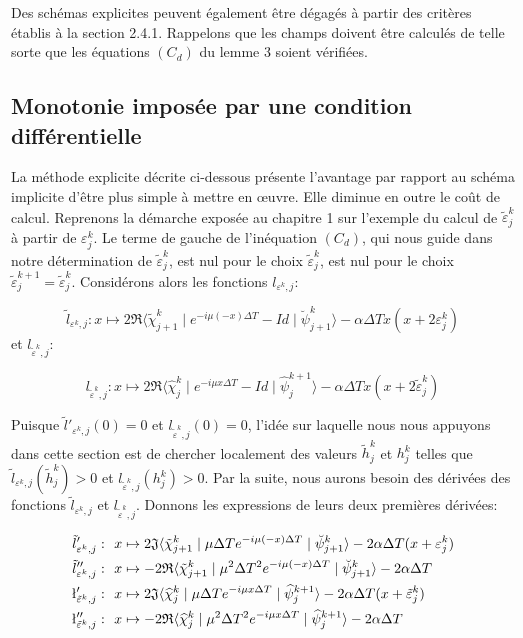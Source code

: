 Des schémas explicites peuvent également être dégagés à partir des critères établis à la section 2.4.1. Rappelons que les champs doivent être calculés de telle sorte que les équations $(C_d )$ du lemme 3 soient vérifiées.

\subsection{Monotonie imposée par une condition différentielle}
La méthode explicite décrite ci-dessous présente l’avantage par rapport au schéma implicite d’être plus simple à mettre en œuvre. Elle diminue en outre le coût de calcul. Reprenons la démarche exposée au chapitre 1 sur l’exemple du calcul de $\tilde{\varepsilon}_j^k$ à partir de $\varepsilon_j^k$. Le terme de gauche de l'inéquation $(C_d)$, qui nous guide dans notre détermination de $\tilde{\varepsilon}_j^k$, est nul pour le choix $\tilde{\varepsilon}_j^k$, est nul pour le choix $\tilde{\varepsilon}_j^{k+1} = \tilde{\varepsilon}_j^k$. Considérons alors les fonctions $l_{\varepsilon^k,j}$:

$$ \tilde{l}_{\varepsilon^k,j}: x \mapsto 2\mathfrak{R} \langle \tilde{\chi}_{j+1}^k \mid e^{-i\mu(-x)\Delta T}-Id \mid \breve{\psi}_{j+1}^k\rangle - \alpha \Delta Tx(x+2\varepsilon_j^k)$$
et $l_{\tilde{\varepsilon}^k,j}$:

$$ l_{\tilde{\varepsilon}^k,j}: x \mapsto 2\mathfrak{R} \langle \widehat{\chi}_{j}^k \mid e^{-i\mu x\Delta T}-Id \mid \widehat{\psi}_{j}^{k+1}\rangle - \alpha \Delta Tx(x+2 \tilde{\varepsilon}_j^k)$$

Puisque  $\tilde{l}'_{\varepsilon^k,j}(0) = 0$ et $l_{\tilde{\varepsilon}^k,j}(0)=0$, l'idée sur laquelle nous nous appuyons dans cette section est de chercher localement des valeurs  $\tilde{h}_j^k$ et $h_j^k$ telles que $\tilde{l}_{\varepsilon^k,j}(\tilde{h}_j^k) >0$ et $l_{\tilde{\varepsilon}^k,j}(h_j^k)>0$. Par la suite, nous aurons besoin des dérivées des fonctions $\tilde{l}_{\varepsilon^k,j}$ et $l_{\tilde{\varepsilon}^k,j}$. Donnons les expressions de leurs deux premières dérivées:

\begin{align*}
	\tilde{l}'_{\varepsilon^k,j} :& \ \ x \mapsto 2 \mathfrak{J} \langle \tilde{\chi}_{j+1}^k \mid \mu \Delta T e^{-i \mu (-x)\Delta T} \mid \breve{\psi}_{j+1}^k \rangle - 2 \alpha\Delta T (x + \varepsilon_j^k)\\
	\tilde{l}''_{\varepsilon^k,j} :& \ \ x \mapsto -2 \mathfrak{R} \langle \tilde{\chi}_{j+1}^k \mid \mu^2 \Delta T^2 e^{-i \mu (-x)\Delta T} \mid \breve{\psi}_{j+1}^k \rangle - 2 \alpha\Delta T\\
	\l'_{\tilde{\varepsilon}^k,j} :& \ \ x \mapsto 2 \mathfrak{J} \langle \widehat{\chi}_{j}^k \mid \mu \Delta T e^{-i \mu x\Delta T} \mid \widehat{\psi}_{j}^{k+1} \rangle - 2 \alpha\Delta T (x + \tilde{\varepsilon}_j^k)\\
	\l''_{\tilde{\varepsilon}^k,j} :& \ \ x \mapsto -2 \mathfrak{R} \langle \widehat{\chi}_{j}^k \mid \mu^2 \Delta T^2 e^{-i \mu x\Delta T} \mid \widehat{\psi}_{j}^{k+1} \rangle - 2 \alpha\Delta T\\	
\end{align*}

